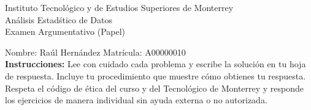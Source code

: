 \documentclass[10pt]{report}
\begin{document}
\newpage



\begin{center}
{\large Instituto Tecnol\'{o}gico y de Estudios Superiores de Monterrey \\
An\'alisis Estad\'stico de Datos } \\
Examen Argumentativo (Papel)
\end{center}

Nombre: \underline{\hspace*{.2in}}
Raúl Hernández
\underline{\hspace*{.2in}} \quad Matr\'icula:\underline{\hspace*{.2in}}
A00000010
\underline{\hspace*{.2in}} \\

{\bf Instrucciones:} Lee con cuidado cada problema y escribe la soluci\'on
en tu hoja de respuesta. Incluye tu procedimiento que muestre c\'omo obtienes tu respuesta.  Respeta el c\'odigo de \'etica del curso y del Tecnol\'ogico de Monterrey y responde los ejercicios de manera individual sin ayuda externa o no autorizada.
\end{document}
